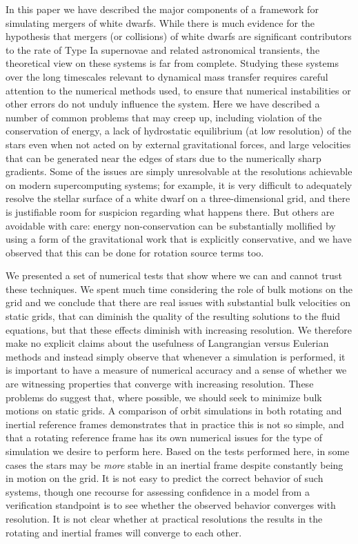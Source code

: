 \documentclass[iop]{../emulateapj}
\begin{document}
In this paper we have described the major components of a framework for 
simulating mergers of white dwarfs. While there is much evidence for the 
hypothesis that mergers (or collisions) of white dwarfs are significant 
contributors to the rate of Type Ia supernovae and related astronomical 
transients, the theoretical view on these systems is far from complete. 
Studying these systems over the long timescales relevant to dynamical 
mass transfer requires careful attention to the numerical methods used, 
to ensure that numerical instabilities or other errors do not unduly 
influence the system. Here we have described a number of common problems
that may creep up, including violation of the conservation of energy, 
a lack of hydrostatic equilibrium (at low resolution) of the stars 
even when not acted on by external gravitational forces, and large 
velocities that can be generated near the edges of stars due to the 
numerically sharp gradients. Some of the issues are simply unresolvable
at the resolutions achievable on modern supercomputing systems; 
for example, it is very difficult to adequately resolve the stellar 
surface of a white dwarf on a three-dimensional grid, and there is 
justifiable room for suspicion regarding what happens there. But others
are avoidable with care: energy non-conservation can be substantially 
mollified by using a form of the gravitational work that is explicitly 
conservative, and we have observed that this can be done for rotation 
source terms too.

We presented a set of numerical tests that show where we can 
and cannot trust these techniques. We spent much time considering 
the role of bulk motions on the grid and we conclude that there 
are real issues with substantial bulk velocities on static grids, 
that can diminish the quality of the resulting solutions to the 
fluid equations, but that these effects diminish with increasing 
resolution. We therefore make no explicit claims about the usefulness 
of Langrangian versus Eulerian methods and instead simply observe 
that whenever a simulation is performed, it is important to have 
a measure of numerical accuracy and a sense of whether we are 
witnessing properties that converge with increasing resolution.
These problems do suggest that, where possible, we should seek to 
minimize bulk motions on static grids. A comparison of orbit 
simulations in both rotating and inertial reference frames 
demonstrates that in practice this is not so simple, and that 
a rotating reference frame has its own numerical issues for 
the type of simulation we desire to perform here. Based on 
the tests performed here, in some cases the stars may be 
\textit{more} stable in an inertial frame despite 
constantly being in motion on the grid. It 
is not easy to predict the correct behavior of such systems, 
though one recourse for assessing confidence in a model from a 
verification standpoint is to see whether the observed 
behavior converges with resolution. It is not clear 
whether at practical resolutions the results in the 
rotating and inertial frames will converge to each other.
\end{document}
